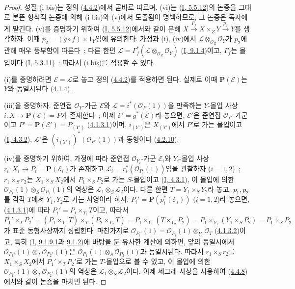 \begin{proof}
성질 (i bis)는 정의
(\hyperref[II.4.4.2-ko]{4.4.2})에서 곧바로 따르며, (vi)는
(\hyperref[I.5.5.12-ko]{I, 5.5.12})의 논증을 그대로 본뜬 형식적
논증에 의해 (i bis)와 (v)에서 도출됨이 명백하므로, 그 논증은 독자에게
맡긴다. (v)를 증명하기 위하여
(\hyperref[I.5.5.12-ko]{I, 5.5.12})에서와 같이 분해
$X\xrightarrow{\Gamma_f}X\times_ZY\xrightarrow{p_2}Y$를 생각하자. 이때
$p_2=(g\circ f)\times1_Y$임에 유의한다. 가정과 (i), (iv)에서
$\mathcal{L}\otimes_{\mathcal{O}_Z}\mathcal{O}_Y$가 $p_2$에 관해 매우
풍부함이 따른다~; 다른 한편
$\mathcal{L}=\Gamma_f^*(\mathcal{L}\otimes_{\mathcal{O}_Z}\mathcal{O}_Y)$
(\hyperref[I.9.1.4-ko]{I, 9.1.4})이고, $\Gamma_f$는 몰입이다
(\hyperref[I.5.3.11-ko]{I, 5.3.11})~; 따라서 (i bis)를 적용할 수 있다.


(i)를 증명하려면 $\mathcal{E}=\mathcal{L}$로 놓고 정의
(\hyperref[II.4.4.2-ko]{4.4.2})를 적용하면 된다. 실제로 이때
$\mathbf{P}(\mathcal{E})$는 $Y$와 동일시된다
(\hyperref[II.4.1.4-ko]{4.1.4}).

(iii)을 증명하자. 준연접 $\mathcal{O}_Y$-가군 $\mathcal{E}$와
$\mathcal{L}=i^*(\mathcal{O}_P(1))$을 만족하는 $Y$-몰입 사상
$i:X\to\mathbf{P}(\mathcal{E})=P$가 존재한다~; 이제
$\mathcal{E}'=g^*(\mathcal{E})$라 놓으면, $\mathcal{E}'$은 준연접
$\mathcal{O}_{Y'}$-가군이고
$P'=\mathbf{P}(\mathcal{E}')=P_{(Y')}$
(\hyperref[II.4.1.3.1-ko]{4.1.3.1})이며, $i_{(Y')}$은
$X_{(Y')}$에서 $P'$로 가는 몰입이고
(\hyperref[I.4.3.2-ko]{I, 4.3.2}), $\mathcal{L}'$은
$(i_{(Y')})^*(\mathcal{O}_{P'}(1))$과 동형이다
(\hyperref[II.4.2.10-ko]{4.2.10}).

(iv)를 증명하기 위하여, 가정에 따라 준연접
$\mathcal{O}_{Y_i}$-가군 $\mathcal{E}_i$와 $Y_i$-몰입 사상
$r_i:X_i\to P_i=\mathbf{P}(\mathcal{E}_i)$가 존재하고
$\mathcal{L}_i=r_i^*(\mathcal{O}_{P_i}(1))$임을 관찰하자 ($i=1,2$)~;
$r_1\times_Sr_2$는 $X_1\times_SX_2$에서 $P_1\times_SP_2$로 가는
$S$-몰입이고 (\hyperref[I.4.3.1-ko]{I, 4.3.1}), 이 몰입에 의한
$\mathcal{O}_{P_1}(1)\otimes_S\mathcal{O}_{P_2}(1)$의 역상은
$\mathcal{L}_1\otimes_S\mathcal{L}_2$이다. 다른 한편
$T=Y_1\times_SY_2$라 놓고, $p_1,p_2$를 각각 $T$에서 $Y_1,Y_2$로 가는
사영이라 하자. $P_i'=\mathbf{P}(p_i^*(\mathcal{E}_i))$ ($i=1,2$)라 놓으면,
(\hyperref[II.4.1.3.1-ko]{4.1.3.1})에 따라
$P_i'=P_i\times_{Y_i}T$이고, 따라서
\[
  P_1'\times_TP_2'
  =(P_1\times_{Y_1}T)\times_T(P_2\times_{Y_2}T)
  =P_1\times_{Y_1}(T\times_{Y_2}P_2)
  =P_1\times_{Y_1}(Y_1\times_SP_2)
  =P_1\times_SP_2
\]
가 표준 동형사상까지 성립한다. 마찬가지로
$\mathcal{O}_{P_i'}(1)=\mathcal{O}_{P_i}(1)\otimes_{Y_i}\mathcal{O}_T$
(\hyperref[II.4.1.3.2-ko]{4.1.3.2})이고, 특히
(\hyperref[I.9.1.9.1-ko]{I, 9.1.9.1}과
\hyperref[I.9.1.2-ko]{9.1.2})에 바탕을 둔 유사한 계산에 의하면, 앞의
동일시에서 $\mathcal{O}_{P_1'}(1)\otimes_T\mathcal{O}_{P_2'}(1)$은
$\mathcal{O}_{P_1}(1)\otimes_S\mathcal{O}_{P_2}(1)$과 동일시된다.
따라서 $r_1\times_Sr_2$를 $X_1\times_SX_2$에서
$P_1'\times_TP_2'$로 가는 $T$-몰입으로 볼 수 있고, 이 몰입에 의한
$\mathcal{O}_{P_1'}(1)\otimes_T\mathcal{O}_{P_2'}(1)$의 역상은
$\mathcal{L}_1\otimes_S\mathcal{L}_2$이다. 이제 세그레 사상을 사용하여
(\hyperref[II.4.4.8-ko]{4.4.8})에서와 같이 논증을 마치면 된다.


\end{proof}
